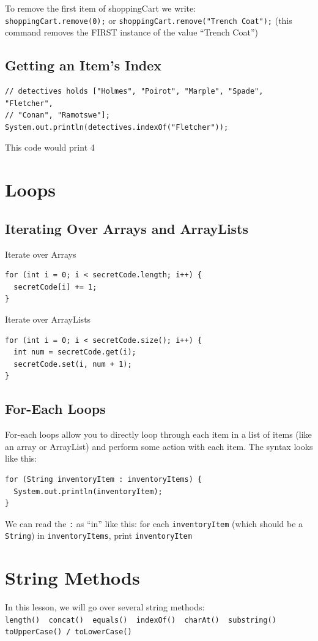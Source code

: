 \documentclass[a4paper, 12pt]{article}
\begin{document}
To remove the first item of shoppingCart we write:\\
\verb|shoppingCart.remove(0);| or \verb|shoppingCart.remove("Trench Coat");| (this command removes the FIRST instance of the value ``Trench Coat'')

\subsection{Getting an Item's Index}
\begin{verbatim}
// detectives holds ["Holmes", "Poirot", "Marple", "Spade", "Fletcher", 
// "Conan", "Ramotswe"];
System.out.println(detectives.indexOf("Fletcher"));
\end{verbatim}
This code would print 4


\section{Loops}
\subsection{Iterating Over Arrays and ArrayLists}
Iterate over Arrays
\begin{verbatim}
for (int i = 0; i < secretCode.length; i++) {
  secretCode[i] += 1;
}
\end{verbatim}

Iterate over ArrayLists
\begin{verbatim}
for (int i = 0; i < secretCode.size(); i++) {
  int num = secretCode.get(i);
  secretCode.set(i, num + 1);
}
\end{verbatim}

\subsection{For-Each Loops}
For-each loops allow you to directly loop through each item in a list of items (like an array or ArrayList) and perform some action with each item. The syntax looks like this:
\begin{verbatim}
for (String inventoryItem : inventoryItems) {
  System.out.println(inventoryItem);
}
\end{verbatim}
We can read the \verb|:| as ``in'' like this: for each \verb|inventoryItem| (which should be a \verb|String|) in \verb|inventoryItems|, print \verb|inventoryItem|


\section{String Methods}
In this lesson, we will go over several string methods:\\
\verb|length()  concat()  equals()  indexOf()  charAt()  substring()|\\
\verb|toUpperCase() / toLowerCase()|
\end{document}
